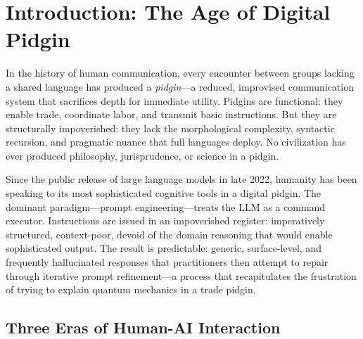 \documentclass[12pt,a4paper]{article}
\begin{document}
\begin{abstract}
We present the ontological framework relating Digital Craftsmanship and Framework Injection through Aristotelian constitutive inherence, classify the research program as a Lakatosian research program named the \emph{Artisanal Intelligence Program}, and articulate its integration with four companion systems: STEER (retrieval), IMI (memory), IMI Theory (persistence), and SYMBIONT (multi-agent coordination).

Stop commanding AI. Start educating it.

\medskip
\noindent\textbf{Keywords:} Digital Craftsmanship, Framework Injection, Adversarial Tempering Protocol, epistemic praxis, human-AI interaction, prompt engineering, context engineering, Lakatosian research program
\end{abstract}

\newpage
\tableofcontents
\newpage

\section{Introduction: The Age of Digital Pidgin}
\label{sec:introduction}

In the history of human communication, every encounter between groups lacking a shared language has produced a \emph{pidgin}---a reduced, improvised communication system that sacrifices depth for immediate utility. Pidgins are functional: they enable trade, coordinate labor, and transmit basic instructions. But they are structurally impoverished: they lack the morphological complexity, syntactic recursion, and pragmatic nuance that full languages deploy. No civilization has ever produced philosophy, jurisprudence, or science in a pidgin.

Since the public release of large language models in late 2022, humanity has been speaking to its most sophisticated cognitive tools in a digital pidgin. The dominant paradigm---prompt engineering---treats the LLM as a command executor. Instructions are issued in an impoverished register: imperatively structured, context-poor, devoid of the domain reasoning that would enable sophisticated output. The result is predictable: generic, surface-level, and frequently hallucinated responses that practitioners then attempt to repair through iterative prompt refinement---a process that recapitulates the frustration of trying to explain quantum mechanics in a trade pidgin.

\subsection{Three Eras of Human-AI Interaction}
\end{document}
